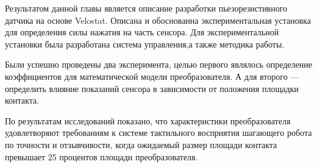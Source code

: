 Результатом данной главы является описание разработки пьезорезистивного датчика на основе Velostat. Описана и обоснованна экспериментальная установка для определения силы нажатия на часть сенсора. Для экспериментальной установки была разработана система управления,а также методика работы. 

Были успешно проведены два эксперимента, целью первого являлось определение коэффициентов для математической модели преобразователя. А для второго --- определить влияние показаний сенсора в зависимости от положения площадки контакта. 

По результатам исследований показано, что характеристики преобразователя удовлетворяют требованиям к системе тактильного восприятия шагающего робота  по точности и отзывчивости, когда ожидаемый размер площади контакта превышает 25 процентов площади преобразователя.